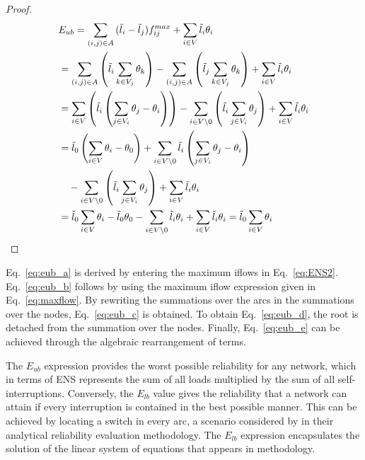 \begin{proof}
\begin{subequations}
 	\begin{align} 
		\displaystyle &E_{ub} = \sum_{(i,j) \in A}{(\tilde{l}_i-\tilde{l}_j)f^{max}_{ij}} + \sum_{i \in V}{\tilde{l}_i\theta_{i}} \label{eq:eub_a}  \\
		&= \sum_{(i,j) \in A}{\left( \tilde{l}_i\sum_{k \in V_j}{\theta_k} \right)} - \sum_{(i,j) \in A}{\left( \tilde{l}_j\sum_{k \in V_j}{\theta_k} \right)} + \sum_{i \in V}{\tilde{l}_i\theta_{i}} \label{eq:eub_b}  \\
		&= \sum_{i \in V}{\left( \tilde{l}_i \left( \sum_{j \in V_i}{\theta_j} - \theta_i \right) \right)} - \sum_{i \in V \setminus {0}}{\left( \tilde{l}_i\sum_{j \in V_i}{\theta_j} \right)} + \sum_{i \in V}{\tilde{l}_i\theta_{i}} \label{eq:eub_c} \\
		&= \tilde{l}_0 \left( \sum_{i \in V}{\theta_i} - \theta_0 \right) + \sum_{i \in V \setminus {0}}{\tilde{l}_i \left( \sum_{j \in V_i}{\theta_j} - \theta_i \right) } \nonumber \\ 
		& \ \ \ - \sum_{i \in V \setminus {0}}{\left( \tilde{l}_i\sum_{j \in V_i}{\theta_j} \right)} + \sum_{i \in V}{\tilde{l}_i\theta_{i}} \label{eq:eub_d}  \\		
		&= \tilde{l}_0\sum_{i \in V}{\theta_i} - \tilde{l}_0\theta_0 - \sum_{i \in V \setminus {0}}{\tilde{l}_i\theta_i} + \sum_{i \in V}{\tilde{l}_i\theta_{i}}  = \tilde{l}_0\sum_{i \in V}{\theta_i} \label{eq:eub_e}
	\end{align}
\end{subequations}
\end{proof}

Eq.~\eqref{eq:eub_a} is derived by entering the maximum iflows in Eq.~\eqref{eq:ENS2}. Eq.~\eqref{eq:eub_b} follows by using the maximum iflow expression given in Eq.~\eqref{eq:maxflow}. By rewriting the summations over the arcs in the summations over the nodes, Eq.~\eqref{eq:eub_c} is obtained. To obtain Eq.~\eqref{eq:eub_d}, the root is detached from the summation over the nodes. Finally, Eq.~\eqref{eq:eub_e} can be achieved through the algebraic rearrangement of terms. 

The $E_{ub}$ expression provides the worst possible reliability for any network, which in terms of ENS represents the sum of all loads multiplied by the sum of all self-interruptions. Conversely, the $E_{lb}$ value gives the reliability that a network can attain if every interruption is contained in the best possible manner. This can be achieved by locating a switch in every arc, a scenario considered by \cite{TabaresEtal2019} in their analytical reliability evaluation methodology. The $E_{lb}$ expression encapsulates the solution of the linear system of equations that appears in \cite{TabaresEtal2019} methodology. 


